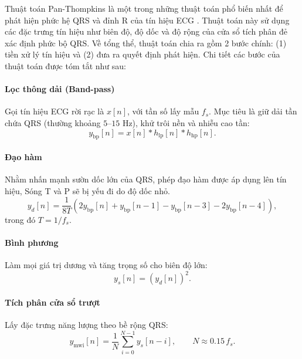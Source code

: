 \documentclass[../DoAn.tex]{subfiles}
\begin{document}
Thuật toán Pan-Thompkins là một trong những thuật toán phổ biến nhất để phát hiện phức hệ QRS và đỉnh R của tín hiệu ECG \cite{panRealTimeQRSDetection1985a}. Thuật toán này sử dụng các đặc trưng tín hiệu như biên độ, độ dốc và độ rộng của cửa sổ tích phân đẻ xác định phức bộ QRS. Về tổng thể, thuật toán chia ra gồm 2 bước chính: (1) tiền xử lý tín hiệu và (2) đưa ra quyết định phát hiện. Chi tiết các bước của thuật toán được tóm tắt như sau:

\paragraph{Lọc thông dải (Band-pass)}

Gọi tín hiệu ECG rời rạc là $x[n]$, với tần số lấy mẫu $f_s$.
Mục tiêu là giữ dải tần chứa QRS (thường khoảng $5$--$15$ Hz), khử trôi nền và nhiễu cao tần:
\begin{equation}
  y_{\mathrm{bp}}[n] = x[n] * h_{\mathrm{lp}}[n] * h_{\mathrm{hp}}[n].
\end{equation}

\paragraph{Đạo hàm}

Nhằm nhấn mạnh sườn dốc lớn của QRS, phép đạo hàm được áp dụng lên tín hiệu, Sóng T và P sẽ bị yếu đi do độ dốc nhỏ.
\begin{equation}
  y_d[n] = \frac{1}{8T}\left(2y_{\mathrm{bp}}[n] + y_{\mathrm{bp}}[n-1] - y_{\mathrm{bp}}[n-3] - 2y_{\mathrm{bp}}[n-4]\right),
\end{equation}
trong đó $T=1/f_s$.

\paragraph{Bình phương}

Làm mọi giá trị dương và tăng trọng số cho biên độ lớn:
\begin{equation}
  y_s[n] = \left(y_d[n]\right)^2.
\end{equation}

\paragraph{Tích phân cửa sổ trượt}

Lấy đặc trưng năng lượng theo bề rộng QRS:
\begin{equation}
  y_{\mathrm{mwi}}[n] = \frac{1}{N}\sum_{i=0}^{N-1} y_s[n-i], \qquad N \approx 0.15\,f_s.
\end{equation}
\end{document}
